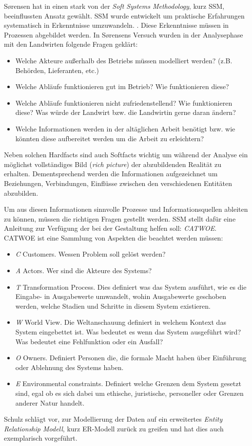 S\o rensen hat in \cite{jour:Sorensen2010} einen stark von der \textit{Soft Systems Methodology}, kurz SSM, beeinflussten Ansatz gewählt. SSM wurde entwickelt um praktische Erfahrungen systematisch in Erkenntnisse umzuwandeln. \cite{jour:Checkland2000}. Diese Erkenntnisse müssen in Prozessen abgebildet werden. In S\o rensens Versuch wurden in der Analysephase mit den Landwirten folgende Fragen geklärt:
\begin{itemize}
 \item Welche Akteure außerhalb des Betriebs müssen modelliert werden? (z.B. Behörden, Lieferanten, etc.)
 \item Welche Abläufe funktionieren gut im Betrieb? Wie funktionieren diese?
 \item Welche Abläufe funktionieren nicht zufriedenstellend? Wie funktionieren diese? Was würde der Landwirt bzw. die Landwirtin gerne daran ändern?
 \item Welche Informationen werden in der altäglichen Arbeit benötigt bzw. wie könnten diese aufbereitet werden um die Arbeit zu erleichtern?
\end{itemize}

Neben solchen Hardfacts sind auch Softfacts wichtig um während der Analyse ein möglichst vollständiges Bild (\textit{rich picture}) der abzubildenden Realität zu erhalten. Dementsprechend werden die Informationen aufgezeichnet um Beziehungen, Verbindungen, Einflüsse zwischen den verschiedenen Entitäten abzubilden.

Um aus diesen Informationen sinnvolle Prozesse und Informationsquellen ableiten zu können, müssen die richtigen Fragen gestellt werden. SSM stellt dafür eine Anleitung zur Verfügung der bei der Gestaltung helfen soll: \textit{CATWOE}. CATWOE ist eine Sammlung von Aspekten die beachtet werden müssen:
\begin{itemize}
	\item \textit{C} Customers. Wessen Problem soll gelöst werden?
	\item \textit{A} Actors. Wer sind die Akteure des Systems?
	\item \textit{T} Transformation Process. Dies definiert was das System ausführt, wie es die Eingabe- in Ausgabewerte umwandelt, wohin Ausgabewerte geschoben werden, welche Stadien und Schritte in diesem System existieren.
	\item \textit{W} World View. Die Weltanschauung definiert in welchem Kontext das System eingebettet ist. Was bedeutet es wenn das System ausgeführt wird? Was bedeutet eine Fehlfunktion oder ein Ausfall?
	\item \textit{O} Owners. Definiert Personen die, die formale Macht haben über Einführung oder Ablehnung des Systems haben.
	\item \textit{E} Environmental constraints. Definiert welche Grenzen dem System gesetzt sind, egal ob es sich dabei um ethische, juristische, personeller oder Grenzen anderer Natur handelt.
\end{itemize}

Schulz schlägt vor, zur Modellierung der Daten auf ein erweitertes \textit{Entity Relationship Modell}, kurz ER-Modell zurück zu greifen und hat dies auch exemplarisch vorgeführt. 


